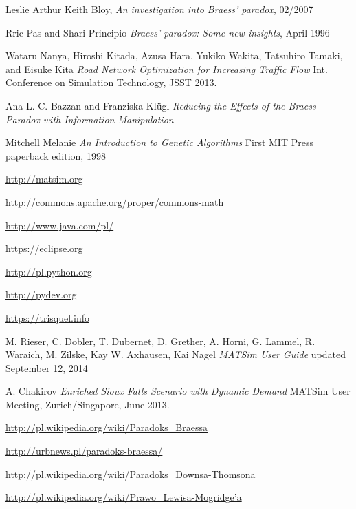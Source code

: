 \documentclass[twoside,12pt]{report}
\begin{document}
\begin{thebibliography}{99}
	Leslie Arthur Keith Bloy, 
	\newblock \textit{An investigation into Braess’ paradox}, 02/2007

	Rric Pas and Shari Principio
	\newblock \textit{Braess’ paradox: Some new insights}, April 1996

	Wataru Nanya, Hiroshi Kitada, Azusa Hara, Yukiko Wakita, Tatsuhiro Tamaki, and Eisuke Kita
	\newblock \textit{Road Network Optimization for Increasing Traffic Flow}
	\newblock Int. Conference on Simulation Technology, JSST 2013.

	Ana L. C. Bazzan and Franziska Klügl
	\newblock \textit{Reducing the Effects of the Braess Paradox with Information Manipulation}

	Mitchell Melanie
	\newblock \textit{An Introduction to Genetic Algorithms}
	\newblock First MIT Press paperback edition, 1998

	\url{http://matsim.org}	

	\url{http://commons.apache.org/proper/commons-math}

	\url{http://www.java.com/pl/}

	\url{https://eclipse.org}
				
	\url{http://pl.python.org}
	
	\url{http://pydev.org}
	
	\url{https://trisquel.info}
			
	M. Rieser, C. Dobler, T. Dubernet, D. Grether, A. Horni, G. Lammel, R. Waraich, M. Zilske, Kay W. Axhausen, Kai Nagel
	\newblock \textit{MATSim User Guide}
	\newblock updated September 12, 2014

	A. Chakirov
	\newblock \textit{Enriched Sioux Falls Scenario with Dynamic Demand}
	\newblock MATSim User Meeting, Zurich/Singapore, June 2013.
	
	\url{http://pl.wikipedia.org/wiki/Paradoks_Braessa}
	
	\url{http://urbnews.pl/paradoks-braessa/}
	
	\url{http://pl.wikipedia.org/wiki/Paradoks_Downsa-Thomsona}
	
	
	\url{http://pl.wikipedia.org/wiki/Prawo_Lewisa-Mogridge’a}

\end{thebibliography}
\end{document}
